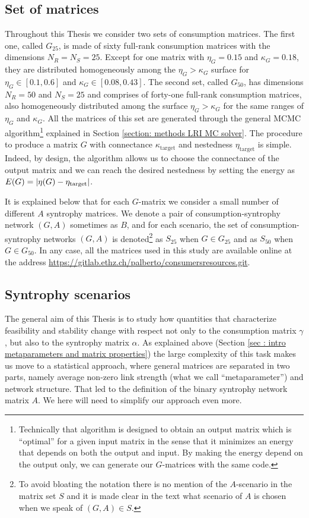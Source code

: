 \documentclass[12pt]{report}
\begin{document}
\subsection{Set of matrices}\label{sec : set of matrices}
Throughout this Thesis we consider two sets of consumption matrices. The first one, called $G_{25}$, is made of sixty full-rank consumption matrices with the dimensions $N_R=N_S=25$. Except for one matrix with $\eta_G=0.15$ and $\kappa_G=0.18$, they are  distributed homogeneously among the $\eta_G>\kappa_G$ surface for $\eta_G \in [0.1, 0.6]$ and $\kappa_G \in [0.08, 0.43]$. The second set, called $G_{50}$, has dimensions $N_R=50$ and $N_S=25$ and comprises of forty-one full-rank consumption matrices, also homogeneously distributed among the surface $\eta_G>\kappa_G$ for the same ranges of $\eta_G$ and $\kappa_G$. All the matrices of this set are generated through the general MCMC algorithm\footnote{Technically that algorithm is designed to obtain an output matrix which is ``optimal'' for a given input matrix in the sense that it minimizes an energy that depends on both the output and input. By making the energy depend on the output only, we can generate our $G$-matrices with the same code.} explained in Section \ref{section: methods LRI MC solver}. The procedure to produce a matrix $G$ with connectance $\kappa_{\text{target}}$ and nestedness $\eta_{\text{target}}$ is simple. Indeed, by design, the algorithm allows us to choose the connectance of the output matrix and we can reach the desired nestedness by setting the energy as $E(G)=\left|{\eta(G)-\eta_{\text{target}}}\right|$.

It is explained below that for each $G$-matrix we consider a small number of different $A$ syntrophy matrices. We denote a pair of consumption-syntrophy network $(G,A)$ sometimes as $B$, and for each scenario, the set of consumption-syntrophy networks $(G,A)$ is denoted\footnote{To avoid bloating the notation there is no mention of the $A$-scenario in the matrix set $S$ and it is made clear in the text what scenario of $A$ is chosen when we speak of $(G,A) \in S$.} as $S_{25}$ when $G \in G_{25}$ and as $S_{50}$ when $G \in G_{50}$.
In any case, all the matrices used in this study are available online at the address \url{https://gitlab.ethz.ch/palberto/consumersresources.git}.

\subsection{Syntrophy scenarios}\label{sec: syntrophy scenarios}
The general aim of this Thesis is to study how quantities that characterize feasibility and stability change with respect not only to the consumption matrix $\gamma$, but also to the syntrophy matrix $\alpha$. As explained above (Section \ref{sec : intro metaparameters and matrix properties}) the large complexity of this task makes us move to a statistical approach, where general matrices are separated in two parts, namely average non-zero link strength (what we call ``metaparameter'') and network structure. That led to the definition of the binary syntrophy network matrix $A$. We here will need to simplify our approach even more.
\end{document}

